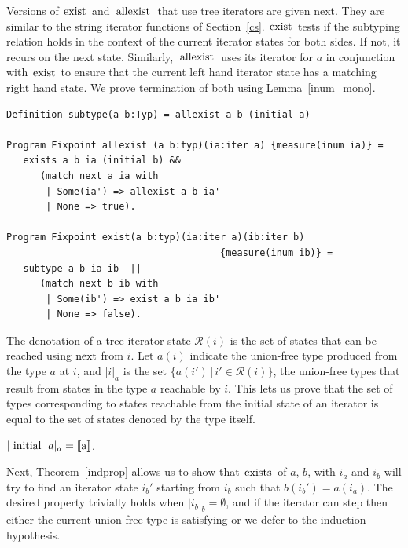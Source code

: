 \documentclass[a4paper,english]{lipics-v2019}
\newcommand{\denotes}[1]{\llbracket #1 \rrbracket}
\renewcommand{\c}[1]{\ensuremath{\text{\lstinline{#1}}}\xspace}
\begin{document}
\noindent
Versions of \c{exist} and \c{allexist} that use tree iterators are given
next. They are similar to the string iterator functions of Section~\ref{cs}.
\c{exist} tests if the subtyping relation holds in the context of the
current iterator states for both sides. If not, it recurs on the next
state. Similarly, \c{allexist} uses its iterator for $a$ in conjunction with
\c{exist} to ensure that the current left hand iterator state has a matching
right hand state. We prove termination of both using Lemma~\ref{inum_mono}.

\begin{lstlisting}
Definition subtype(a b:Typ) = allexist a b (initial a)

Program Fixpoint allexist (a b:typ)(ia:iter a) {measure(inum ia)} =
   exists a b ia (initial b) && 
      (match next a ia with 
       | Some(ia') => allexist a b ia' 
       | None => true).

Program Fixpoint exist(a b:typ)(ia:iter a)(ib:iter b)
                                      {measure(inum ib)} =
   subtype a b ia ib  || 
      (match next b ib with 
       | Some(ib') => exist a b ia ib' 
       | None => false).
\end{lstlisting}

\newcommand{\irdn}[1]{\ensuremath{\mathcal{R}({#1})}}
\newcommand{\irch}[2]{\ensuremath{|#1|_{#2}}}

\noindent
The denotation of a tree iterator state $\irdn{i}$ is the set of states that
can be reached using \c{next} from $i$. Let $a(i)$ indicate the union-free
type produced from the type $a$ at $i$, and \irch{i}{a} is the set
$\{a(i')\,|\,i'\in\irdn{i}\}$, the union-free types that result from states
in the type $a$ reachable by $i$.  This lets us prove that the set of types
corresponding to states reachable from the initial state of an iterator is
equal to the set of states denoted by the type itself.

\begin{lemma}\label{triter_eq}
$\irch{\c{initial}~a}{a} = \denotes{\c a}$.
\end{lemma}

\noindent
Next, Theorem~\ref{indprop} allows us to show that \c{exists} of $a$, $b$,
with $i_a$ and $i_b$ will try to find an iterator state $i_b'$ starting from
$i_b$ such that $b(i_b') = a(i_a)$. The desired property trivially holds
when $\irch{i_b}{b} = \emptyset$, and if the iterator can step then either
the current union-free type is satisfying or we defer to the induction
hypothesis.
\end{document}
